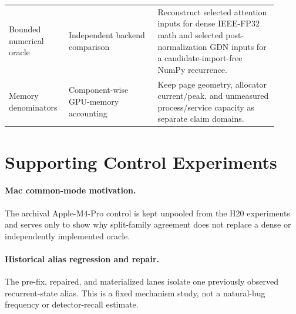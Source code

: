 \documentclass{article}
\begin{document}
\begin{table}[H]
\begin{tabular}{@{}p{0.18\linewidth}p{0.31\linewidth}p{0.42\linewidth}@{}}
Bounded numerical oracle & Independent backend comparison~\citep{pham2019cradle} & Reconstruct selected attention inputs for dense IEEE-FP32 math and selected post-normalization GDN inputs for a candidate-import-free NumPy recurrence. \\
Memory denominators & Component-wise GPU-memory accounting~\citep{gao2020dnnmem} & Keep page geometry, allocator current/peak, and unmeasured process/service capacity as separate claim domains. \\
\bottomrule
\end{tabular}
\end{table}

\FloatBarrier

\section{Supporting Control Experiments}
\label{app:controls}

\paragraph{Mac common-mode motivation.}
The archival Apple-M4-Pro control is kept unpooled from the H20 experiments and
serves only to show why split-family agreement does not replace a dense or
independently implemented oracle.


\paragraph{Historical alias regression and repair.}
The pre-fix, repaired, and materialized lanes isolate one previously observed
recurrent-state alias.  This is a fixed mechanism study, not a natural-bug
frequency or detector-recall estimate.

\end{document}

